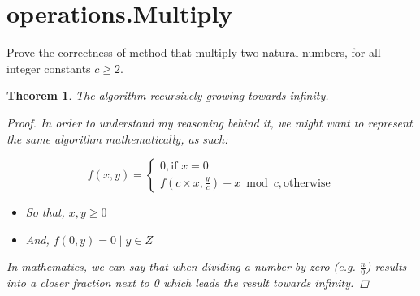 \documentclass{article}
\newtheorem{theorem}{Theorem}
\begin{document}
\section{operations.Multiply}

Prove the correctness of method that multiply two natural numbers, for all integer constants $c \geq 2$.

\begin{theorem}
The algorithm recursively growing towards infinity.

\begin{proof}
In order to understand my reasoning behind it, we might want to represent the same algorithm mathematically, as such:

\[
    f(x,y) =
    \begin{cases}
        0, \text{if } x = 0\\
        f(c \times x, \frac{y}{c}) + x \bmod{c}, \text{otherwise}
    \end{cases}
\]

\begin{itemize}
  \item So that, $x, y \geq 0$
  \item And, $f(0, y) = 0 \mid y \in Z$
\end{itemize}

In mathematics, we can say that when dividing a number by zero (e.g. $\frac{n}{0}$) results into a closer fraction next to 0 which leads the result towards infinity.

\end{proof}

\end{theorem}
\end{document}
